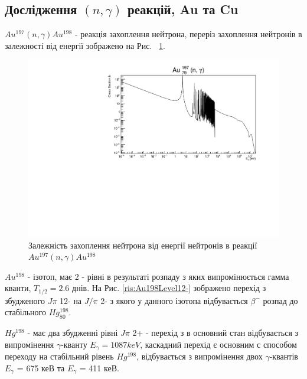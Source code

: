 \documentclass[a4paper, 14pt]{article}
\numberwithin{equation}{section}
\numberwithin{table}{section}
\begin{document}
\subsection{Дослідження $(n, \gamma)$ реакцій, Au та Cu} 
$Au^{197}(n,\gamma)Au^{198}$ - реакція захоплення нейтрона, переріз захоплення нейтронів в залежності від енергії зображено на Рис.~ \ref{ris:AuSigma}.
\begin{figure}[hbt!]
	\centering \includegraphics[width=1\textwidth]{sigma/Au197Sigma.pdf}
	\caption{Залежність захоплення нейтрона від енергії нейтронів в реакції  $Au^{197}(n,\gamma)Au^{198}$} 
	\label{ris:AuSigma}	
\end{figure} 

$Au^{198} $ - ізотоп, має 2 - рівні в результаті розпаду з яких випромінюється гамма кванти, $T_{1/2} = 2.6$ днів. На Рис. \ref{ris:Au198Level12-} зображено перехід з збудженого $J\pi$ 12- на $J/\pi$ 2- з якого у данного ізотопа відбувається $\beta^-$ розпад до стабільного $Hg^{198}_{80}$.

$Hg^{198}$ - має два збудженні рівні $J\pi$ 2+ - перехід з  в основний стан відбувається з випромінення $\gamma$-кванту $E_\gamma=1087keV$, каскадний перехід є основним с способом переходу на стабільний рівень $Hg^{198}$, відбувається з випромінення двох $\gamma$-квантів $E_\gamma$ = 675 кеВ та $E_\gamma$ = 411 кеВ. 
\end{document}
